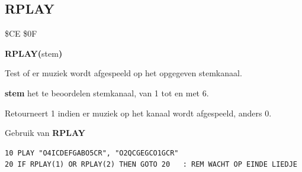 \subsection{RPLAY}
\begin{description}[leftmargin=2cm,style=nextline]
\item [Token:]    \$CE \$0F

\item [Formaat:]   {\bf RPLAY(}stem{\bf)}

\item [Retourneert:]  Test of er muziek wordt afgespeeld op het opgegeven stemkanaal.

                  {\bf stem} het te beoordelen stemkanaal, van 1 tot en met 6.

                  Retourneert 1 indien er muziek op het kanaal wordt afgespeeld, anders 0.

\item [Voorbeeld:]  Gebruik van {\bf RPLAY}

\begin{tcolorbox}[colback=black,coltext=white]
\verbatimfont{\codefont}
\begin{verbatim}
10 PLAY "O4ICDEFGABO5CR", "O2QCGEGCO1GCR"
20 IF RPLAY(1) OR RPLAY(2) THEN GOTO 20   : REM WACHT OP EINDE LIEDJE
\end{verbatim}
\end{tcolorbox}
\end{description}


\newpage
